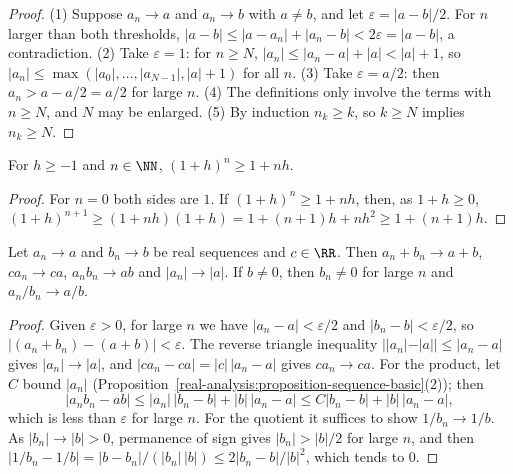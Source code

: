 \begin{proof}
(1) Suppose $a_n \to a$ and $a_n \to b$ with $a \neq b$, and let $\varepsilon = |a - b|/2$. For $n$ larger than both thresholds, $|a - b| \leq |a - a_n| + |a_n - b| < 2\varepsilon = |a - b|$, a contradiction.
(2) Take $\varepsilon = 1$: for $n \geq N$, $|a_n| \leq |a_n - a| + |a| < |a| + 1$, so $|a_n| \leq \max(|a_0|, \ldots, |a_{N-1}|, |a| + 1)$ for all $n$. (3) Take $\varepsilon = a/2$: then
$a_n > a - a/2 = a/2$ for large $n$. (4) The definitions only involve the terms with $n \geq N$, and $N$ may be enlarged. (5) By induction $n_k \geq k$, so $k \geq N$ implies $n_k \geq N$.
\end{proof}

\begin{lemma}\label{real-analysis:lemma-bernoulli}
For $h \geq -1$ and $n \in \NN$, $(1 + h)^n \geq 1 + nh$.
\end{lemma}

\begin{proof}
For $n = 0$ both sides are $1$. If $(1 + h)^n \geq 1 + nh$, then, as $1 + h \geq 0$, $(1 + h)^{n+1} \geq (1 + nh)(1 + h) = 1 + (n + 1)h + nh^2 \geq 1 + (n + 1)h$.
\end{proof}

\begin{proposition}\label{real-analysis:proposition-algebra-limits}
Let $a_n \to a$ and $b_n \to b$ be real sequences and $c \in \RR$. Then $a_n + b_n \to a + b$, $ca_n \to ca$, $a_nb_n \to ab$ and $|a_n| \to |a|$. If $b \neq 0$, then $b_n \neq 0$ for large $n$ and
$a_n/b_n \to a/b$.
\end{proposition}

\begin{proof}
Given $\varepsilon > 0$, for large $n$ we have $|a_n - a| < \varepsilon/2$ and $|b_n - b| < \varepsilon/2$, so $|(a_n + b_n) - (a + b)| < \varepsilon$. The reverse triangle inequality
$||a_n| - |a|| \leq |a_n - a|$ gives $|a_n| \to |a|$, and $|ca_n - ca| = |c|\,|a_n - a|$ gives $ca_n \to ca$. For the product, let $C$ bound $|a_n|$
(Proposition~\ref{real-analysis:proposition-sequence-basic}(2)); then
\[
|a_nb_n - ab| \leq |a_n|\,|b_n - b| + |b|\,|a_n - a| \leq C|b_n - b| + |b|\,|a_n - a|,
\]
which is less than $\varepsilon$ for large $n$. For the quotient it suffices to show $1/b_n \to 1/b$. As $|b_n| \to |b| > 0$, permanence of sign gives $|b_n| > |b|/2$ for large $n$, and then
$|1/b_n - 1/b| = |b - b_n|/(|b_n|\,|b|) \leq 2|b_n - b|/|b|^2$, which tends to $0$.
\end{proof}

